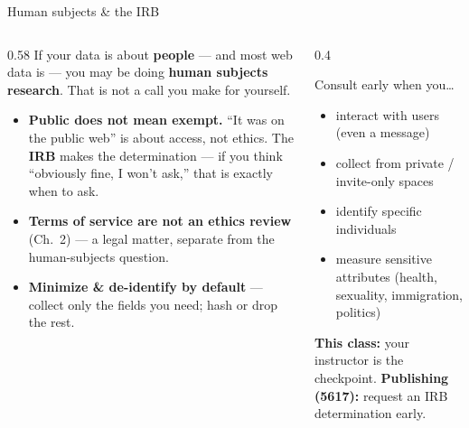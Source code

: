 \documentclass[9pt,aspectratio=169]{beamer}
\begin{document}
\begin{frame}{Human subjects \& the IRB}
    \begin{columns}[T]
        \begin{column}{0.58\textwidth}
            If your data is about \textbf{people} --- and most web data is --- you may be doing \textbf{human subjects research}. That is not a call you make for yourself.
            \begin{itemize}\small
                \item \textbf{Public does not mean exempt.} ``It was on the public web'' is about access, not ethics. The \textbf{IRB} makes the determination --- if you think ``obviously fine, I won't ask,'' that is exactly when to ask.
                \item \textbf{Terms of service are not an ethics review} (Ch.~2) --- a legal matter, separate from the human-subjects question.
                \item \textbf{Minimize \& de-identify by default} --- collect only the fields you need; hash or drop the rest.
            \end{itemize}
        \end{column}
        \begin{column}{0.4\textwidth}
            \begin{block}{Consult early when you\dots}
                \footnotesize
                \begin{itemize}\footnotesize
                    \item interact with users (even a message)
                    \item collect from private / invite-only spaces
                    \item identify specific individuals
                    \item measure sensitive attributes (health, sexuality, immigration, politics)
                \end{itemize}
            \end{block}
            {\footnotesize \textbf{This class:} your instructor is the checkpoint. \textbf{Publishing (5617):} request an IRB determination early.}
        \end{column}
    \end{columns}
\end{frame}
\end{document}
